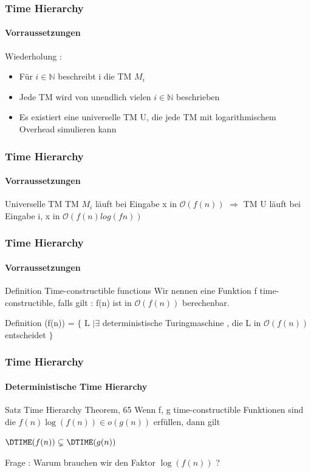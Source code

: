 \begin{frame}
	\frametitle{Time Hierarchy}
	\framesubtitle{Vorraussetzungen}
	Wiederholung :
	\begin{itemize}[<+->]
		\item Für $i\in \mathbb{N}$ beschreibt i die TM $M_i$
		\item Jede TM wird von unendlich vielen $i\in \mathbb{N}$ beschrieben
		\item Es existiert eine universelle TM U, die jede TM mit logarithmischem Overhead 					simulieren kann
	\end{itemize}
\end{frame}
\begin{frame}
	\frametitle{Time Hierarchy}
	\framesubtitle{Vorraussetzungen}
	\begin{KITexampleblock}{Universelle TM}
	TM $M_i$ läuft bei Eingabe x in $\mathcal{O}(f(n))$
	$\Rightarrow$ TM U läuft bei Eingabe i, x in $\mathcal{O}(f(n)log(fn))$
	\end{KITexampleblock}
\end{frame}
\begin{frame}
	\frametitle{Time Hierarchy}
	\framesubtitle{Vorraussetzungen}
	\begin{KITinfoblock}{Definition Time-constructible functions}
		Wir nennen eine Funktion f time-constructible, falls gilt : \newline
		f(n) ist in $\mathcal{O}(f(n))$ berechenbar. 
	\end{KITinfoblock}
	
	\bigskip
	\pause	
	
	\begin{KITinfoblock}{Definition \DTIME }
		\DTIME(f(n)) = $\lbrace$ L $\vert \exists$ deterministische Turingmaschine ,
		 die L in $\mathcal{O}(f(n))$ entscheidet $\rbrace$
	\end{KITinfoblock}
\end{frame}
\begin{frame}
	\frametitle{Time Hierarchy}
	\framesubtitle{Deterministische Time Hierarchy}
	
	\begin{KITinfoblock}{Satz Time Hierarchy Theorem, 65}
	Wenn f, g  time-constructible Funktionen sind die  
	$f(n)\log(f(n)) \in o(g(n))$ erfüllen, dann gilt

		$\DTIME(f(n)) \subsetneq \DTIME(g(n))$
		
	\end{KITinfoblock}
	
	\pause

	Frage : Warum brauchen wir den Faktor $\log(f(n))$ ?
\end{frame}

